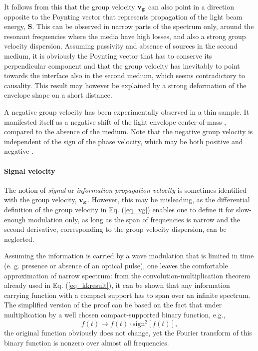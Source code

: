It follows from this that the group velocity ${\mathbf{v_g}}$ can also point in a direction opposite to the Poynting vector that represents propagation of the light beam energy, $\mathbf{S}$. 
This can be observed in narrow parts of the spectrum only, around the resonant frequencies where the media have high losses, and also a strong group velocity dispersion.
Assuming passivity and absence of sources in the second medium, it is obviously the Poynting vector that has to conserve its perpendicular component and that the group velocity has inevitably to point towards the interface also in the second medium, which seems contradictory to causality.
This result 
may however be explained by a strong deformation of the envelope shape on a short distance. %

A negative group velocity has been experimentally observed in a thin sample. It manifested itself as a negative shift of the light envelope center-of-mass \cite{dolling2006simultaneous},  compared to the absence of the medium. Note that the negative group velocity is independent of the sign of the phase velocity, which may be both positive and negative \cite{mikki2009electromagnetic}. 

\paragraph{Signal velocity}%
The notion of \textit{signal} or \textit{information propagation velocity} is sometimes %
identified with the group velocity, ${\mathbf{v_g}}$. However, this may be misleading, as the differential definition of the group velocity in Eq. (\ref{eq_vg}) enables one to define it for slow-enough modulation only, as long as  the span of frequencies is narrow and the second derivative, corresponding to the group velocity dispersion, can be neglected.

Assuming the information is carried by a wave modulation that is limited in time (e. g. presence or absence of an optical pulse), one leaves the comfortable approximation of narrow spectrum: from the convolution-multiplication theorem already used in Eq. (\ref{eq_kkresult}), it can be shown that any information carrying function with a compact support has to span over an infinite spectrum. The simplified version of the proof \cite{hill2013uncertainty} can be based on the fact that under multiplication by a well chosen compact-supported binary function, e.g., 
$$ f(t) \rightarrow f(t) \cdot \mathrm{sign}^2[f(t)], $$
the original function obviously does not change, yet the Fourier transform of this binary function is nonzero over almost all frequencies. 

